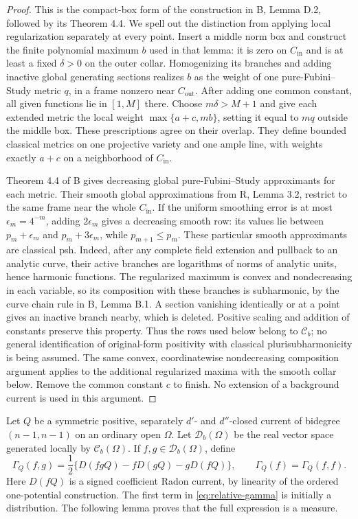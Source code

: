 \documentclass[11pt,a4paper]{article}
\numberwithin{equation}{section}
\theoremstyle{definition}
\theoremstyle{remark}
\newcommand{\Cb}{\mathcal C_b}
\begin{document}
\begin{proof}
This is the compact-box form of the construction in \textup{B},
Lemma D.2, followed by its Theorem 4.4. We spell out the distinction
from applying local regularization separately at every point.
Insert a middle norm box and construct the finite polynomial maximum
$b$ used in that lemma: it is zero on $C_{\mathrm{in}}$ and is at
least a fixed $\delta>0$ on the outer collar. Homogenizing its branches
and adding inactive global generating sections realizes $b$ as the
weight of one pure-Fubini--Study metric $q$, in a frame nonzero near
$C_{\mathrm{out}}$. After adding one common constant, all given
functions lie in $[1,M]$ there. Choose $m\delta>M+1$ and give each
extended metric the local weight $\max\{a+c,mb\}$, setting it equal
to $mq$ outside the middle box. These prescriptions agree on their
overlap. They define bounded classical metrics on one projective
variety and one ample line, with weights exactly $a+c$ on a
neighborhood of $C_{\mathrm{in}}$.

Theorem 4.4 of \textup{B} gives decreasing global pure-Fubini--Study
approximants for each metric. Their smooth global approximations from
\textup{R}, Lemma 3.2, restrict to the same frame near the whole
$C_{\mathrm{in}}$. If the uniform smoothing error is at most
$\epsilon_m=4^{-m}$, adding $2\epsilon_m$ gives a decreasing smooth
row: its values lie between $p_m+\epsilon_m$ and
$p_m+3\epsilon_m$, while $p_{m+1}\leq p_m$.
These particular smooth approximants are classical psh. Indeed, after
any complete field extension and pullback to an analytic curve, their
active branches are logarithms of norms of analytic units, hence
harmonic functions. The regularized maximum is convex and
nondecreasing in each variable, so its composition with these branches
is subharmonic, by the curve chain rule in \textup{B}, Lemma B.1.
A section vanishing identically or at a point gives
an inactive branch nearby, which is deleted. Positive scaling and addition of
constants preserve this property. Thus the rows used below belong to
$\Cb$; no general identification of original-form positivity with
classical plurisubharmonicity is being assumed. The same convex,
coordinatewise nondecreasing composition argument applies to the
additional regularized maxima with the smooth collar below.
Remove the common constant $c$ to finish. No extension of a background
current is used in this argument.

\end{proof}

Let $Q$ be a symmetric positive, separately $d'$- and $d''$-closed
current of bidegree $(n-1,n-1)$ on an ordinary open $\Omega$. Let
$\mathcal D_b(\Omega)$ be the real vector space generated locally by
$\Cb(\Omega)$. If $f,g\in\mathcal D_b(\Omega)$, define
\begin{equation}
\label{eq:relative-gamma}
 \Gamma_Q(f,g)
   =\frac12\bigl\{D(fgQ)-fD(gQ)-gD(fQ)\bigr\},
 \qquad \Gamma_Q(f)=\Gamma_Q(f,f).
\end{equation}
Here $D(fQ)$ is a signed coefficient Radon current, by linearity of
the ordered one-potential construction. The first term in
\eqref{eq:relative-gamma} is initially a distribution. The following
lemma proves that the full expression is a measure.
\end{document}
